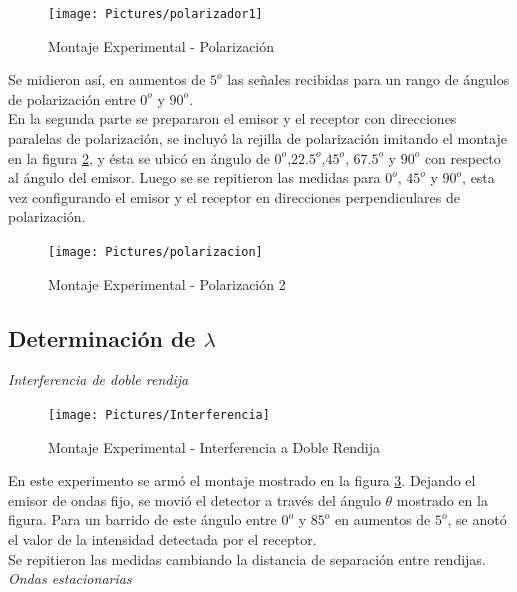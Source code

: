 \documentclass[prb,aps,twocolumn,preprintnumbers,amsmath,amssymb]{revtex4}
\begin{document}
\begin{figure}[h!]
\centering
\texttt{[image: Pictures/polarizador1]}
\caption{Montaje Experimental - Polarización}
\label{fig:polarizador1}
\end{figure}

Se midieron así, en aumentos de $5^o$ las señales recibidas para un rango de ángulos de polarización entre $0^o$ y $90^o$. \\

En la segunda parte se prepararon el emisor y el receptor con direcciones paralelas de polarización, se incluyó la rejilla de polarización imitando el montaje en la figura \ref{fig:polarizacion}, y ésta se ubicó en ángulo de $0^o$,$22.5^o$,$45^o$, $67.5^o$ y $90^o$ con respecto al ángulo del emisor. Luego se  se repitieron las medidas para $0^o$, $45^o$ y $90^o$, esta vez configurando el emisor y el receptor en direcciones perpendiculares de polarización.\\ 

\begin{figure}[h!]
\centering
\texttt{[image: Pictures/polarizacion]}
\caption{Montaje Experimental - Polarización 2}
\label{fig:polarizacion}
\end{figure}

\subsection{\label{sec:level2}Determinación de $ \lambda $}
\textit{Interferencia de doble rendija} \\

\begin{figure}[h!]
\centering
\texttt{[image: Pictures/Interferencia]}
\caption{Montaje Experimental - Interferencia a Doble Rendija}
\label{fig:Interferencia}
\end{figure}

En este experimento se armó el montaje mostrado en la figura \ref{fig:Interferencia}. Dejando el emisor de ondas fijo, se movió el detector a través del ángulo $ \theta $ mostrado en la figura. Para un barrido de este ángulo entre $0^o$ y $85^o$ en aumentos de $5^o$, se anotó el valor de la intensidad detectada por el receptor. \\

Se repitieron las medidas cambiando la distancia de separación entre rendijas.\\ 

\textit{Ondas estacionarias} \\
\end{document}
